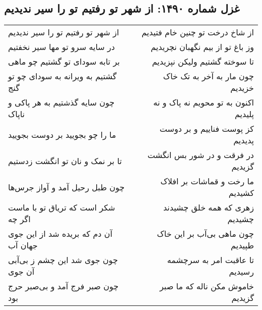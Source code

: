 \begin{center}
\section*{غزل شماره ۱۴۹۰: از شهر تو رفتیم تو را سیر ندیدیم}
\label{sec:1490}
\begin{longtable}{l p{0.5cm} r}
از شهر تو رفتیم تو را سیر ندیدیم
&&
از شاخ درخت تو چنین خام فتیدیم
\\
در سایه سرو تو مها سیر نخفتیم
&&
وز باغ تو از بیم نگهبان نچریدیم
\\
بر تابه سودای تو گشتیم چو ماهی
&&
تا سوخته گشتیم ولیکن نپزیدیم
\\
گشتیم به ویرانه به سودای چو تو گنج
&&
چون مار به آخر به تک خاک خزیدیم
\\
چون سایه گذشتیم به هر پاکی و ناپاک
&&
اکنون به تو محویم نه پاک و نه پلیدیم
\\
ما را چو بجویید بر دوست بجویید
&&
کز پوست فناییم و بر دوست پدیدیم
\\
تا بر نمک و نان تو انگشت زدستیم
&&
در فرقت و در شور بس انگشت گزیدیم
\\
چون طبل رحیل آمد و آواز جرس‌ها
&&
ما رخت و قماشات بر افلاک کشیدیم
\\
شکر است که تریاق تو با ماست اگر چه
&&
زهری که همه خلق چشیدند چشیدیم
\\
آن دم که بریده شد از این جوی جهان آب
&&
چون ماهی بی‌آب بر این خاک طپیدیم
\\
چون جوی شد این چشم ز بی‌آبی آن جوی
&&
تا عاقبت امر به سرچشمه رسیدیم
\\
چون صبر فرج آمد و بی‌صبر حرج بود
&&
خاموش مکن ناله که ما صبر گزیدیم
\\
\end{longtable}
\end{center}
